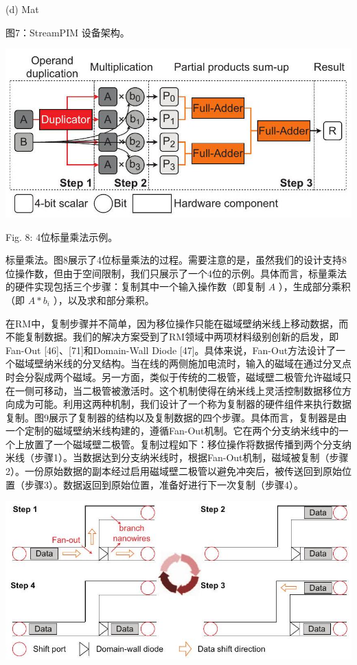 \documentclass[10pt]{article}
\begin{document}
(d) Mat

图7：StreamPIM 设备架构。

\begin{center}
\includegraphics[max width=\textwidth]{2024_05_12_abeba8a85da5b5ec4c7bg-05(3)}
\end{center}


Fig. 8: 4位标量乘法示例。


标量乘法。图8展示了4位标量乘法的过程。需要注意的是，虽然我们的设计支持8位操作数，但由于空间限制，我们只展示了一个4位的示例。具体而言，标量乘法的硬件实现包括三个步骤：复制其中一个输入操作数（即复制 $A$ ），生成部分乘积（即 $A * b_{i}$ ），以及求和部分乘积。

在RM中，复制步骤并不简单，因为移位操作只能在磁域壁纳米线上移动数据，而不能复制数据。我们的解决方案受到了RM领域中两项材料级别创新的启发，即Fan-Out [46]、[71]和Domain-Wall Diode [47]。具体来说，Fan-Out方法设计了一个磁域壁纳米线的分叉结构。当在线的两侧施加电流时，输入的磁域在通过分叉点时会分裂成两个磁域。另一方面，类似于传统的二极管，磁域壁二极管允许磁域只在一侧可移动，当二极管被激活时。这个机制使得在纳米线上灵活控制数据移位方向成为可能。利用这两种机制，我们设计了一个称为复制器的硬件组件来执行数据复制。图9展示了复制器的结构以及复制数据的四个步骤。具体而言，复制器是由一个定制的磁域壁纳米线构建的，遵循Fan-Out机制。它在两个分支纳米线中的一个上放置了一个磁域壁二极管。复制过程如下：移位操作将数据传播到两个分支纳米线（步骤1）。当数据达到分支纳米线时，根据Fan-Out机制，磁域被复制（步骤2）。一份原始数据的副本经过启用磁域壁二极管以避免冲突后，被传送回到原始位置（步骤3）。数据返回到原始位置，准备好进行下一次复制（步骤4）。

\begin{center}
\includegraphics[max width=\textwidth]{2024_05_12_abeba8a85da5b5ec4c7bg-05}
\end{center}
\end{document}
